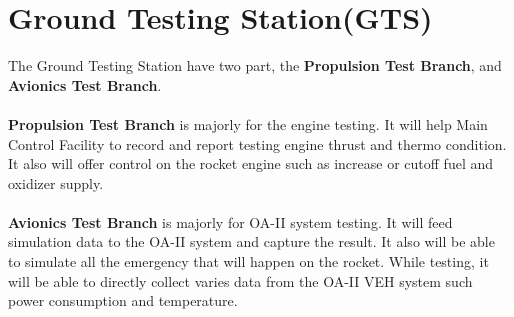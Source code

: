 \documentclass[12pt,article]{memoir}
\begin{document}
\section{Ground Testing Station(GTS)}
The Ground Testing Station have two part, the \textbf{Propulsion Test Branch}, and \textbf{Avionics Test Branch}.\\\\
\textbf{Propulsion Test Branch} is majorly for the engine testing. It will help Main Control Facility to record and report testing engine thrust and thermo condition. It also will offer control on the rocket engine such as increase or cutoff fuel and oxidizer supply.\\\\
\textbf{Avionics Test Branch} is majorly for OA-II system testing. It will feed simulation data to the OA-II system and capture the result. It also will be able to simulate all the emergency that will happen on the rocket. While testing, it will be able to directly collect varies data from the OA-II VEH system such power consumption and temperature.
\newpage
\end{document}
